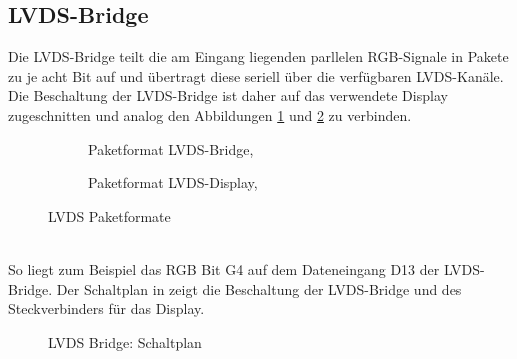 \subsection{LVDS-Bridge}
Die LVDS-Bridge teilt die am Eingang liegenden parllelen RGB-Signale in Pakete zu je acht Bit auf und übertragt diese seriell über die verfügbaren LVDS-Kanäle. Die Beschaltung der LVDS-Bridge ist daher auf das verwendete Display  zugeschnitten und analog den Abbildungen \ref{fig:teilb_lvds_bridge_format} und \ref{fig:teilb_lvds_display_format} zu verbinden.
\begin{figure}[htbp]
        \begin{center}
        \begin{subfigure}[htp]{0.48\textwidth}
 			\caption{Paketformat LVDS-Bridge, \cite{TI2011b}}
            \label{fig:teilb_lvds_bridge_format}
        \end{subfigure}
        \quad
        \begin{subfigure}[htp]{0.48\textwidth}
            \caption{Paketformat LVDS-Display, \cite{LG2012}}
            \label{fig:teilb_lvds_display_format}
        \end{subfigure}
		\end{center}
        \caption{LVDS Paketformate}
        \label{fig:teilb_lvds_format}
\end{figure} \\
So liegt zum Beispiel das RGB Bit G4 auf dem Dateneingang D13 der LVDS-Bridge. Der Schaltplan in  zeigt die Beschaltung der LVDS-Bridge und des Steckverbinders für das Display.\\
\begin{figure}[htp]
		\center
        \caption{LVDS Bridge: Schaltplan}
       \label{fig:teilb_lvds_bridge_sch}
\end{figure}\\
